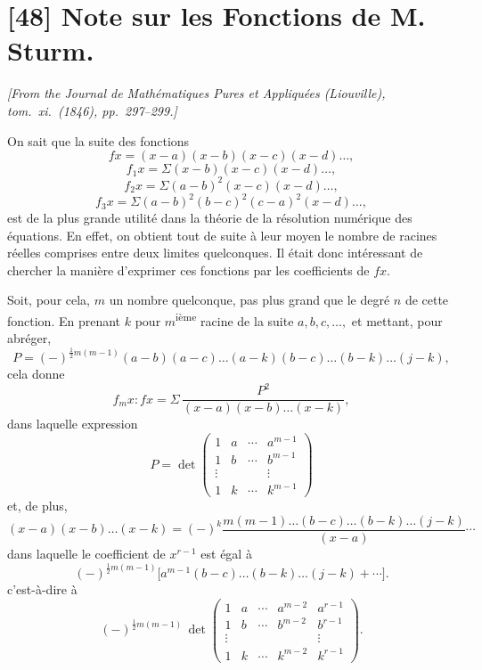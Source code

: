 \documentclass[12pt,a4paper]{article}
\begin{document}
\newpage

\section*{[48] Note sur les Fonctions de M. Sturm.}

\textit{[From the Journal de Math\'ematiques Pures et Appliqu\'ees (Liouville), tom.~xi.~(1846), pp.~297--299.]}

\bigskip

On sait que la suite des fonctions
\[
fx = (x - a)(x - b)(x - c)(x - d)\ldots,
\]
\[
f_1 x = \Sigma(x - b)(x - c)(x - d)\ldots,
\]
\[
f_2 x = \Sigma(a - b)^2(x - c)(x - d)\ldots,
\]
\[
f_3 x = \Sigma(a - b)^2 (b - c)^2 (c - a)^2 (x - d)\ldots,
\]
est de la plus grande utilit\'e dans la th\'eorie de la r\'esolution num\'erique des \'equations. En effet, on obtient tout de suite \`a leur moyen le nombre de racines r\'eelles comprises entre deux limites quelconques. Il \'etait donc int\'eressant de chercher la mani\`ere d'exprimer ces fonctions par les coefficients de $fx$.

Soit, pour cela, $m$ un nombre quelconque, pas plus grand que le degr\'e $n$ de cette fonction. En prenant $k$ pour $m$\textsuperscript{i\`eme} racine de la suite $a, b, c, \ldots,$ et mettant, pour abr\'eger,
\[
P = (-)^{\tfrac12 m(m-1)}(a - b)(a - c)\ldots(a - k)(b - c)\ldots(b - k)\ldots(j - k),
\]
cela donne
\[
f_m x : fx = \Sigma\,\frac{P^2}{(x - a)(x - b)\ldots(x - k)},
\]
dans laquelle expression
\[
P = \det\begin{pmatrix} 1 & a & \cdots & a^{m-1} \\ 1 & b & \cdots & b^{m-1} \\ \vdots & & & \vdots \\ 1 & k & \cdots & k^{m-1} \end{pmatrix}
\]
et, de plus,
\[
(x - a)(x - b)\ldots(x - k) = (-)^k \frac{m(m-1)\ldots(b - c)\ldots(b - k)\ldots(j - k)}{(x - a)}\cdots
\]
dans laquelle le coefficient de $x^{r-1}$ est \'egal \`a
\[
(-)^{\tfrac12 m(m-1)}\bigl[a^{m-1}(b - c)\ldots(b - k)\ldots(j - k) + \cdots\bigr].
\]
c'est-\`a-dire \`a
\[
(-)^{\tfrac12 m(m-1)}\,\det\begin{pmatrix} 1 & a & \cdots & a^{m-2} & a^{r-1} \\ 1 & b & \cdots & b^{m-2} & b^{r-1} \\ \vdots & & & & \vdots \\ 1 & k & \cdots & k^{m-2} & k^{r-1} \end{pmatrix}.
\]
\end{document}

